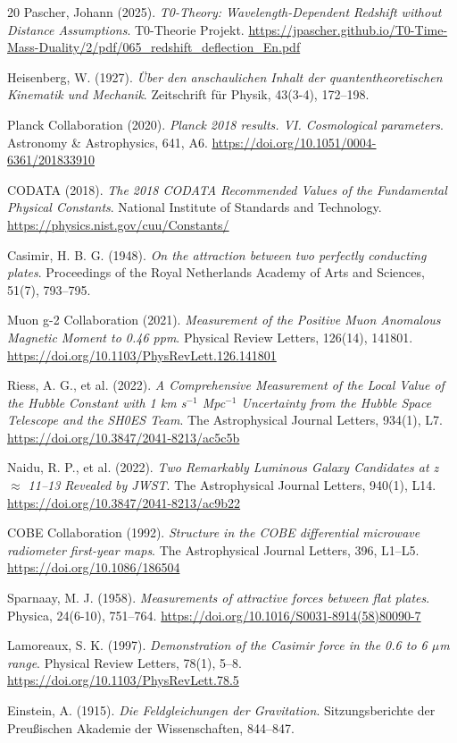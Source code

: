 \begin{thebibliography}{20}
		Pascher, Johann (2025). 
		\textit{T0-Theory: Wavelength-Dependent Redshift without Distance Assumptions}. 
		T0-Theorie Projekt. 
		\url{https://jpascher.github.io/T0-Time-Mass-Duality/2/pdf/065_redshift_deflection_En.pdf}
		
		Heisenberg, W. (1927). 
		\textit{Über den anschaulichen Inhalt der quantentheoretischen Kinematik und Mechanik}. 
		Zeitschrift für Physik, 43(3-4), 172--198.
		
		Planck Collaboration (2020). 
		\textit{Planck 2018 results. VI. Cosmological parameters}. 
		Astronomy \& Astrophysics, 641, A6. 
		\url{https://doi.org/10.1051/0004-6361/201833910}
		
		CODATA (2018). 
		\textit{The 2018 CODATA Recommended Values of the Fundamental Physical Constants}. 
		National Institute of Standards and Technology. 
		\url{https://physics.nist.gov/cuu/Constants/}
		
		Casimir, H. B. G. (1948). 
		\textit{On the attraction between two perfectly conducting plates}. 
		Proceedings of the Royal Netherlands Academy of Arts and Sciences, 51(7), 793--795.
		
		Muon g-2 Collaboration (2021). 
		\textit{Measurement of the Positive Muon Anomalous Magnetic Moment to 0.46 ppm}. 
		Physical Review Letters, 126(14), 141801. 
		\url{https://doi.org/10.1103/PhysRevLett.126.141801}
		
		Riess, A. G., et al. (2022). 
		\textit{A Comprehensive Measurement of the Local Value of the Hubble Constant with 1 km s$^{-1}$ Mpc$^{-1}$ Uncertainty from the Hubble Space Telescope and the SH0ES Team}. 
		The Astrophysical Journal Letters, 934(1), L7. 
		\url{https://doi.org/10.3847/2041-8213/ac5c5b}
		
		Naidu, R. P., et al. (2022). 
		\textit{Two Remarkably Luminous Galaxy Candidates at z $\approx$ 11--13 Revealed by JWST}. 
		The Astrophysical Journal Letters, 940(1), L14. 
		\url{https://doi.org/10.3847/2041-8213/ac9b22}
		
		COBE Collaboration (1992). 
		\textit{Structure in the COBE differential microwave radiometer first-year maps}. 
		The Astrophysical Journal Letters, 396, L1--L5. 
		\url{https://doi.org/10.1086/186504}
		
		Sparnaay, M. J. (1958). 
		\textit{Measurements of attractive forces between flat plates}. 
		Physica, 24(6-10), 751--764. 
		\url{https://doi.org/10.1016/S0031-8914(58)80090-7}
		
		Lamoreaux, S. K. (1997). 
		\textit{Demonstration of the Casimir force in the 0.6 to 6 $\mu$m range}. 
		Physical Review Letters, 78(1), 5--8. 
		\url{https://doi.org/10.1103/PhysRevLett.78.5}
		
		Einstein, A. (1915). 
		\textit{Die Feldgleichungen der Gravitation}. 
		Sitzungsberichte der Preußischen Akademie der Wissenschaften, 844--847.
		
	\end{thebibliography}
	